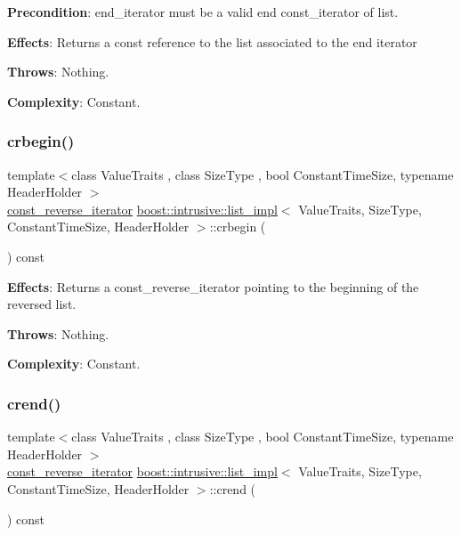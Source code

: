 {\bfseries Precondition}\+: end\+\_\+iterator must be a valid end const\+\_\+iterator of list.

{\bfseries Effects}\+: Returns a const reference to the list associated to the end iterator

{\bfseries Throws}\+: Nothing.

{\bfseries Complexity}\+: Constant. \mbox{\label{classboost_1_1intrusive_1_1list__impl_aaec6d64d661acea3e7b92be73332618a}} 
\subsubsection{\texorpdfstring{crbegin()}{crbegin()}}
{\footnotesize\ttfamily template$<$class Value\+Traits , class Size\+Type , bool Constant\+Time\+Size, typename Header\+Holder $>$ \\
\hyperlink{classboost_1_1intrusive_1_1list__impl_a00a0933ca1d92836a220a604e521d9c4}{const\+\_\+reverse\+\_\+iterator} \hyperlink{classboost_1_1intrusive_1_1list__impl}{boost\+::intrusive\+::list\+\_\+impl}$<$ Value\+Traits, Size\+Type, Constant\+Time\+Size, Header\+Holder $>$\+::crbegin (\begin{DoxyParamCaption}{ }\end{DoxyParamCaption}) const\hspace{0.3cm}{\ttfamily [inline]}}

{\bfseries Effects}\+: Returns a const\+\_\+reverse\+\_\+iterator pointing to the beginning of the reversed list.

{\bfseries Throws}\+: Nothing.

{\bfseries Complexity}\+: Constant. \mbox{\label{classboost_1_1intrusive_1_1list__impl_a9b1515c25e9402cb27796dfeb8236baf}} 
\subsubsection{\texorpdfstring{crend()}{crend()}}
{\footnotesize\ttfamily template$<$class Value\+Traits , class Size\+Type , bool Constant\+Time\+Size, typename Header\+Holder $>$ \\
\hyperlink{classboost_1_1intrusive_1_1list__impl_a00a0933ca1d92836a220a604e521d9c4}{const\+\_\+reverse\+\_\+iterator} \hyperlink{classboost_1_1intrusive_1_1list__impl}{boost\+::intrusive\+::list\+\_\+impl}$<$ Value\+Traits, Size\+Type, Constant\+Time\+Size, Header\+Holder $>$\+::crend (\begin{DoxyParamCaption}{ }\end{DoxyParamCaption}) const\hspace{0.3cm}{\ttfamily [inline]}}

